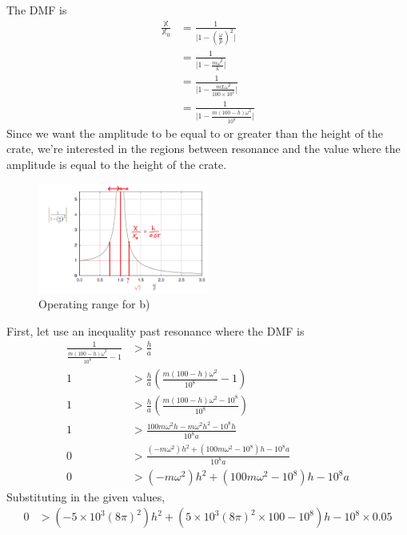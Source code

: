 \subsection{}
The DMF is 
\begin{align*}
    \frac{\mathbb{X}}{\mathbb{X}_0} &= \frac{1}{\bigg| 1 - \left(\frac{\omega}{p}\right)^2 \bigg|} \\
    &= \frac{1}{\bigg| 1 - \frac{m\omega^2}{k} \bigg|} \\
    &= \frac{1}{\bigg| 1 - \frac{mL\omega^2}{100 \times 10^6} \bigg|} \\
    &= \frac{1}{\bigg| 1 - \frac{m(100 - h)\omega^2}{10^8} \bigg|} 
\end{align*}
Since we want the amplitude to be equal to or greater than the height of the crate, we're interested in the regions between resonance and the value where the amplitude is equal to the height of the crate.
\begin{figure}[h]
    \centering
    \includegraphics[width=0.5\textwidth]{Questions/Figures/q2 dmf.png}
    \caption{Operating range for b)}
\end{figure}
First, let use an inequality past resonance where the DMF is
\begin{align*}
    \frac{1}{\frac{m(100 - h)\omega^2}{10^8} - 1} &> \frac{h}{a} \\
    1 &> \frac{h}{a} \left(\frac{m(100 - h)\omega^2}{10^8} - 1\right) \\
    1 &> \frac{h}{a} \left(\frac{m(100 - h)\omega^2 - 10^8}{10^8}\right) \\
    1 &> \frac{100m\omega^2h - m\omega^2h^2 - 10^8h}{10^8a} \\
    0 &> \frac{(-m\omega^2)h^2 + (100m\omega^2 - 10^8)h - 10^8a}{10^8a} \\
    0 &> (-m\omega^2)h^2 + (100m\omega^2 - 10^8)h - 10^8a 
\end{align*}
Substituting in the given values,
\begin{align*}
    0 &> (-5 \times 10^3(8\pi)^2)h^2 + (5 \times 10^3(8\pi)^2 \times 100 - 10^8)h - 10^8 \times 0.05 
\end{align*}

